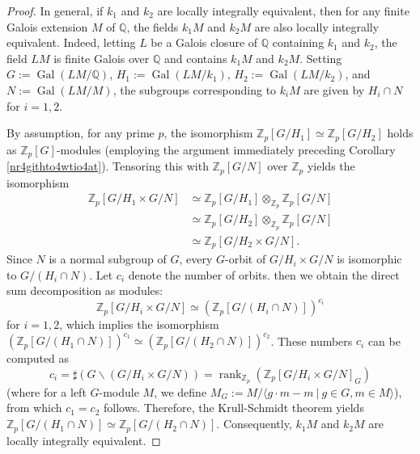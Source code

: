 \documentclass{article}
\numberwithin{equation}{section} %
\begin{document}
\begin{proof}
  In general, if $k_1$ and $k_2$ are locally integrally equivalent, then for any finite Galois extension $M$ of $\mathbb{Q}$, the fields $k_1M$ and $k_2M$ are also locally integrally equivalent. Indeed, letting $L$ be a Galois closure of $\mathbb{Q}$ containing $k_1$ and $k_2$, the field $LM$ is finite Galois over $\mathbb{Q}$ and contains $k_1M$ and $k_2M$. Setting $G := \operatorname{Gal}(LM/\mathbb{Q})$, $H_1 := \operatorname{Gal}(LM/k_1)$, $H_2 := \operatorname{Gal}(LM/k_2)$, and $N := \operatorname{Gal}(LM/M)$, the subgroups corresponding to $k_iM$ are given by $H_i \cap N$ for $i=1,2$.
  
  By assumption, for any prime $p$, the isomorphism $\mathbb{Z}_p[G/H_1] \simeq \mathbb{Z}_p[G/H_2]$ holds as $\mathbb{Z}_p[G]$-modules (employing the argument immediately preceding Corollary \ref{nr4githto4wtio4at}). Tensoring this with $\mathbb{Z}_p[G/N]$ over $\mathbb{Z}_p$ yields the isomorphism
  \begin{align*}
    \mathbb{Z}_p[G/H_1 \times G/N] &\simeq \mathbb{Z}_p[G/H_1] \otimes_{\mathbb{Z}_p} \mathbb{Z}_p[G/N] \\
    &\simeq \mathbb{Z}_p[G/H_2] \otimes_{\mathbb{Z}_p} \mathbb{Z}_p[G/N] \\
    &\simeq \mathbb{Z}_p[G/H_2\times G/N]. 
  \end{align*}
  Since $N$ is a normal subgroup of $G$, every $G$-orbit of $G/H_i \times G/N$ is isomorphic to $G/(H_i \cap N)$. Let $c_i$ denote the number of orbits. then we obtain the direct sum decomposition as modules:
  \[
    \mathbb{Z}_p[G/H_i \times G/N] \simeq (\mathbb{Z}_p[G/(H_i \cap N)])^{c_i}
  \]
  for $i=1,2$, which implies the isomorphism $(\mathbb{Z}_p[G/(H_1 \cap N)])^{c_1} \simeq (\mathbb{Z}_p[G/(H_2 \cap N)])^{c_2}$. These numbers $c_i$ can be computed as
  \[
    c_i = \sharp (G \backslash (G/H_i \times G/N)) = \operatorname{rank}_{\mathbb{Z}_p}(\mathbb{Z}_p[G/H_i \times G/N]_G)
  \]
  (where for a left $G$-module $M$, we define $M_G := M/\langle g\cdot m - m\ | \ g\in G, m \in M\rangle$), from which $c_1 = c_2$ follows. Therefore, the Krull-Schmidt theorem yields $\mathbb{Z}_p[G/(H_1 \cap N)] \simeq \mathbb{Z}_p[G/(H_2 \cap N)]$. Consequently, $k_1M$ and $k_2M$ are locally integrally equivalent.


\end{proof}
\end{document}
